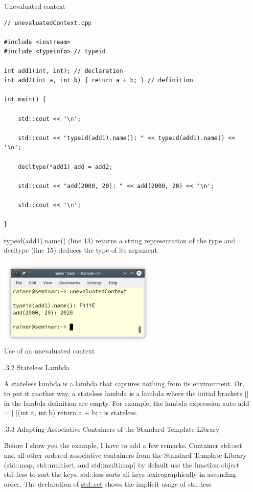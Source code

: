 \noindent
Unevaluated context
\begin{lstlisting}[style=styleCXX]
// unevaluatedContext.cpp

#include <iostream>
#include <typeinfo> // typeid

int add1(int, int); // declaration
int add2(int a, int b) { return a + b; } // definition

int main() {
	
	std::cout << '\n';
	
	std::cout << "typeid(add1).name(): " << typeid(add1).name() << '\n';
	
	decltype(*add1) add = add2;
	
	std::cout << "add(2000, 20): " << add(2000, 20) << '\n';
	
	std::cout << '\n';

}
\end{lstlisting}

typeid(add1).name() (line 13) returns a string representation of the type and decltype (line 15) deduces the type of its argument.


\begin{center}
\includegraphics[width=0.6\textwidth]{content/3/chapter4/images/43.png}\\
Use of an unevaluated context
\end{center}

.3.2\hspace{0.2cm} Stateless Lambda

A stateless lambda is a lambda that captures nothing from its environment. Or, to put it another way, a stateless lambda is a lambda where the initial brackets [] in the lambda definition are empty. For example, the lambda expression auto add = [ ](int a, int b) { return a + b; }; is stateless.

.3.3\hspace{0.2cm} Adapting Associative Containers of the Standard Template Library

Before I show you the example, I have to add a few remarks. Container std::set and all other ordered associative containers from the Standard Template Library (std::map, std::multiset, and std::multimap) by default use the function object std::less to sort the keys. std::less sorts all keys lexicographically in ascending order. The declaration of \href{https://en.cppreference.com/w/cpp/container/set}{std::set} shows the implicit usage of std::less

